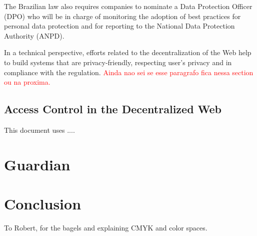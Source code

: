 \documentclass[sigconf]{acmart}
\begin{document}
The Brazilian law also requires companies to nominate a Data Protection Officer (DPO) who will be in charge of monitoring the adoption of best practices for personal data protection and for reporting to the National Data Protection Authority (ANPD).

In a technical perspective, efforts related to the decentralization of the Web help to build systems that are privacy-friendly, respecting user's privacy and in compliance with the regulation.
\textcolor{red}{Ainda nao sei se esse paragrafo fica nessa section ou na proxima.}

\subsection{Access Control in the Decentralized Web}

This document uses ....

\section{Guardian}


\section{Conclusion}

%
\begin{acks}
To Robert, for the bagels and explaining CMYK and color spaces.
\end{acks}

%


\end{document}
